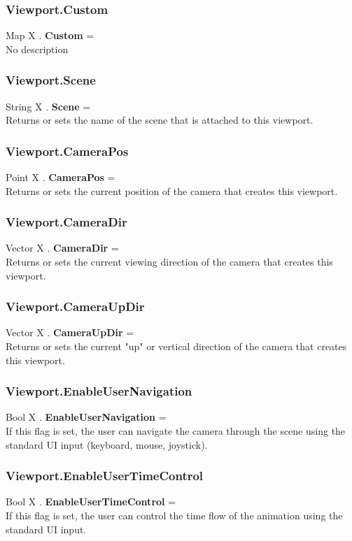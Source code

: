 \documentclass[10pt]{book}
\begin{document}
\subsubsection{Viewport.Custom \label{F:Viewport:Custom}}
Map X . \textbf{Custom} = \\
No description

\subsubsection{Viewport.Scene \label{F:Viewport:Scene}}
String X . \textbf{Scene} = \\
Returns or sets the name of the scene that is attached to this viewport.

\subsubsection{Viewport.CameraPos \label{F:Viewport:CameraPos}}
Point X . \textbf{CameraPos} = \\
Returns or sets the current position of the camera that creates this viewport.

\subsubsection{Viewport.CameraDir \label{F:Viewport:CameraDir}}
Vector X . \textbf{CameraDir} = \\
Returns or sets the current viewing direction of the camera that creates this viewport.

\subsubsection{Viewport.CameraUpDir \label{F:Viewport:CameraUpDir}}
Vector X . \textbf{CameraUpDir} = \\
Returns or sets the current "up" or vertical direction of the camera that creates this viewport.

\subsubsection{Viewport.EnableUserNavigation \label{F:Viewport:EnableUserNavigation}}
Bool X . \textbf{EnableUserNavigation} = \\
If this flag is set, the user can navigate the camera through the scene using the standard UI input (keyboard, mouse, joystick).

\subsubsection{Viewport.EnableUserTimeControl \label{F:Viewport:EnableUserTimeControl}}
Bool X . \textbf{EnableUserTimeControl} = \\
If this flag is set, the user can control the time flow of the animation using the standard UI input.
\end{document}
